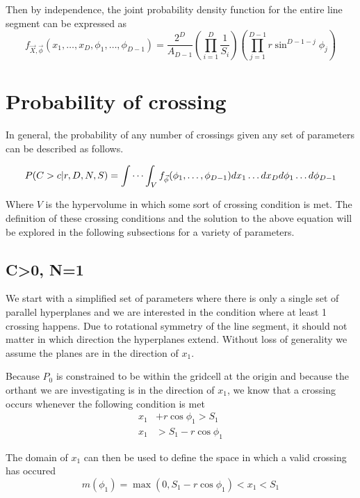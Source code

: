 \documentclass{article}
\begin{document}
Then by independence, the joint probability density function for the entire line segment can be expressed as 
\begin{equation} \label{eq:general pdf}
	f_{\vec{X},\vec{\phi}}(x_1, \hdots, x_D, \phi_1, \hdots, \phi_{D-1}) = \frac{2^D}{A_{D-1}}\left(\prod_{i=1}^D\frac{1}{S_i}\right)\left(\prod_{j=1}^{D-1}r\sin^{D-1-j}\phi_j\right)
\end{equation} 

\section{Probability of crossing}
In general, the probability of any number of crossings given any set of parameters can be described as follows.

\begin{equation} \label{eq:volume integral}
	P(C>c|r, D, N, S)=\idotsint_V f_{\vec\phi}(\phi_1,\hdots,\phi_{D-1})dx_1 \hdots dx_D d\phi_1 \hdots d\phi_{D-1}
\end{equation}

Where $V$ is the hypervolume in which some sort of crossing condition is met. The definition of these crossing conditions and the solution to the above equation will be
explored in the following subsections for a variety of parameters.

\subsection{C>0, N=1}
We start with a simplified set of parameters where there is only a single set of parallel hyperplanes and we are interested in the condition where at least 1 crossing happens. 
Due to rotational symmetry of the line segment, it should not matter in which direction the hyperplanes extend. Without loss of generality we assume the planes are in the
direction of $x_1$.

Because $P_0$ is constrained to be within the gridcell at the origin and because the orthant we are investigating is in the direction of $x_1$, we know that a crossing occurs
whenever the following condition is met
\begin{align}
	x_1 &+ r\cos{\phi_1} > S_1\\
	x_1 &> S_1 - r\cos{\phi_1}
\end{align}

The domain of $x_1$ can then be used to define the space in which a valid crossing has occured 
\begin{equation} \label{eq:crossing condition 0}
	m(\phi_1) = \max(0, S_1-r\cos{\phi_1}) < x_1 < S_1
\end{equation}
\end{document}
